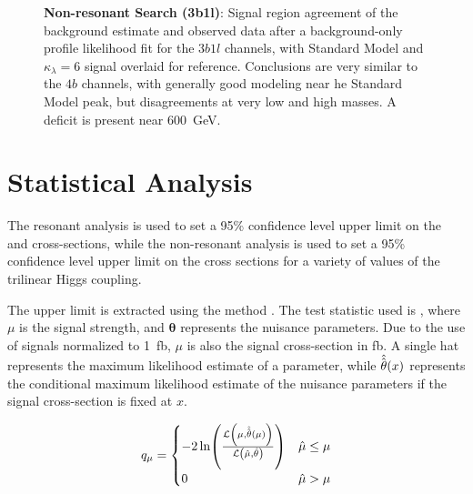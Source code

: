 \begin{figure}[ht]
  \centering
   \hspace*{-2cm}
  \caption{\label{fig:nonres-sr-mhh-3b1l} \textbf{Non-resonant Search (3b1l)}: Signal region agreement of the background estimate and observed data after a background-only profile likelihood fit for the $3b1l$ channels, with Standard Model
  and $\kappa_{\lambda}=6$ signal overlaid for reference. Conclusions are very similar to the $4b$ channels, with generally good modeling near he Standard Model peak, but disagreements at very low and high masses. A deficit is present near \SI{600}{\GeV}.}
\end{figure}

\FloatBarrier
\clearpage
\section{Statistical Analysis}
The resonant analysis is used to set a 95\% confidence level upper limit on the
\HepProcess{\Pp \Pp \to \PScal \to \higgs \higgs \to \Pqb \Paqb \Pqb \Paqb} and
\HepProcess{\Pp \Pp \to \PGrav \to \higgs \higgs \to \Pqb \Paqb \Pqb \Paqb} cross-sections, 
while the non-resonant analysis is used to set a 95\% confidence level upper limit on the
\HepProcess{\Pp \Pp \to \higgs \higgs \to \Pqb \Paqb \Pqb \Paqb} cross sections for a 
variety of values of the trilinear Higgs coupling.

The upper limit is extracted using the \CLs method \cite{Read02}. The test statistic 
used is \qmu \cite{Cowan11}, where $\mu$ is the signal strength, and $\mathbf{\theta}$ represents the nuisance
parameters. Due to the use of signals normalized to \SI{1}{\femto\barn}, $\mu$
is also the signal cross-section in \si{\femto\barn}. A single hat represents
the maximum likelihood estimate of a parameter, while
$\hat{\hat{\mathbf{\theta}}}\qty(x)$ represents the conditional maximum
likelihood estimate of the nuisance parameters if the signal cross-section is
fixed at $x$.


\begin{equation}
	\label{eqn:qmu-def}
	{q}_{\mu} =
	\begin{cases}
		-2\ln(\frac{\mathcal{L}\qty(\mu, \hat{\hat{\mathbf{\theta}}}\qty(\mu))}{\mathcal{L}\qty(\hat{\mu},
		\hat{\mathbf{\theta}})})              & \hat{\mu} \le \mu \\
		0                                     & \hat{\mu} > \mu
	\end{cases}
\end{equation}

